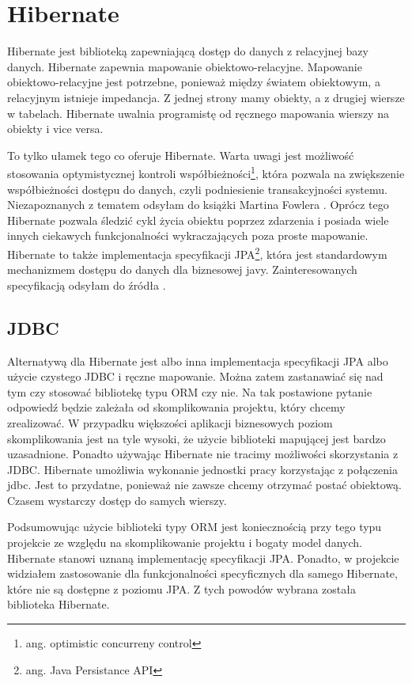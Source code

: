 \documentclass[a4paper,onecolumn,oneside,11pt,wide,floatssmall]{mwrep}
\theoremstyle{definition}
\theoremstyle{plain}%
\theoremstyle{remark}
\begin{document}
\section{Hibernate}
Hibernate \cite{hibernateHome} jest biblioteką zapewniającą dostęp do danych z relacyjnej bazy danych. Hibernate zapewnia mapowanie obiektowo-relacyjne. Mapowanie obiektowo-relacyjne jest potrzebne, ponieważ między światem obiektowym, a relacyjnym istnieje impedancja. Z jednej strony mamy obiekty, a z drugiej wiersze w tabelach. Hibernate uwalnia programistę od ręcznego mapowania wierszy na obiekty i vice versa. 

To tylko ułamek tego co oferuje Hibernate. Warta uwagi jest możliwość stosowania optymistycznej kontroli współbieżności\footnote{ang. optimistic concurreny control}, która pozwala na zwiększenie współbieżności dostępu do danych, czyli podniesienie transakcyjności systemu. Niezapoznanych z tematem odsyłam do książki Martina Fowlera \cite[76]{fowler2003patterns}.
 Oprócz tego Hibernate pozwala śledzić cykl życia obiektu poprzez zdarzenia i posiada wiele innych ciekawych funkcjonalności wykraczających poza proste mapowanie.
Hibernate to także implementacja specyfikacji JPA\footnote{ang. Java Persistance API}, która jest standardowym mechanizmem dostępu do danych dla biznesowej javy. Zainteresowanych specyfikacją odsyłam do źródła \cite{jpa2.0}.

\subsection{JDBC}
Alternatywą dla Hibernate jest albo inna implementacja specyfikacji JPA albo użycie czystego JDBC i ręczne mapowanie. Można zatem zastanawiać się nad tym czy stosować bibliotekę typu ORM czy nie. Na tak postawione pytanie odpowiedź będzie zależała od skomplikowania projektu, który chcemy zrealizować. W przypadku większości aplikacji biznesowych poziom skomplikowania jest na tyle wysoki, że użycie biblioteki mapującej jest bardzo uzasadnione. Ponadto używając Hibernate nie tracimy możliwości skorzystania z JDBC. Hibernate umożliwia wykonanie jednostki pracy korzystając z połączenia jdbc. Jest to przydatne, ponieważ nie zawsze chcemy otrzymać postać obiektową. Czasem wystarczy dostęp do samych wierszy.

Podsumowując użycie biblioteki typy ORM jest koniecznością przy tego typu projekcie ze względu na skomplikowanie projektu i bogaty model danych. Hibernate stanowi uznaną implementację specyfikacji JPA. Ponadto, w projekcie widziałem zastosowanie dla funkcjonalności specyficznych dla samego Hibernate, które nie są dostępne z poziomu JPA. Z tych powodów wybrana została biblioteka Hibernate.
\end{document}
